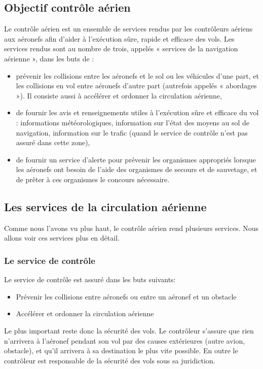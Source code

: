     \subsection{Objectif contrôle aérien}
Le contrôle aérien est un ensemble de services  rendus par les contrôleurs aériens aux aéronefs afin d'aider à l'exécution sûre, rapide et efficace des vols. Les services rendus sont au nombre de trois, appelés « services de la navigation aérienne », dans les buts de :
\begin{itemize}
    \item prévenir les collisions entre les aéronefs et le sol ou les véhicules d'une part, et les collisions en vol entre aéronefs d'autre part (autrefois appelés « abordages »). Il consiste aussi à accélérer et ordonner la circulation aérienne,
    \item de fournir les avis et renseignements utiles à l'exécution sûre et efficace du vol : informations météorologiques, information sur l'état des moyens au sol de navigation, information sur le trafic (quand le service de contrôle n'est pas assuré dans cette zone),
    \item de fournir un service d'alerte pour prévenir les organismes appropriés lorsque les aéronefs ont besoin de l'aide des organismes de secours et de sauvetage, et de prêter à ces organismes le concours nécessaire.
\end{itemize}\medskip

    \subsection{Les services de la circulation aérienne\label{servicesaerien}}
Comme nous l'avons vu plus haut, le contrôle aérien rend plusieurs services. Nous allons voir ces services plus en détail.

        \subsubsection{Le service de contrôle}
Le service de contrôle est assuré dans les buts suivants:
\begin{itemize}
    \item Prévenir les collisions entre aéronefs ou entre un aéronef et un obstacle
    \item Accélérer et ordonner la circulation aérienne
\end{itemize}\medskip

Le plus important reste donc la sécurité des vols. Le contrôleur s'assure que rien n'arrivera à l'aéronef pendant son vol par des causes extérieures (autre avion, obstacle), et qu'il arrivera à sa destination le plus vite possible. En outre le contrôleur est responsable de la sécurité des vols sous sa juridiction.

